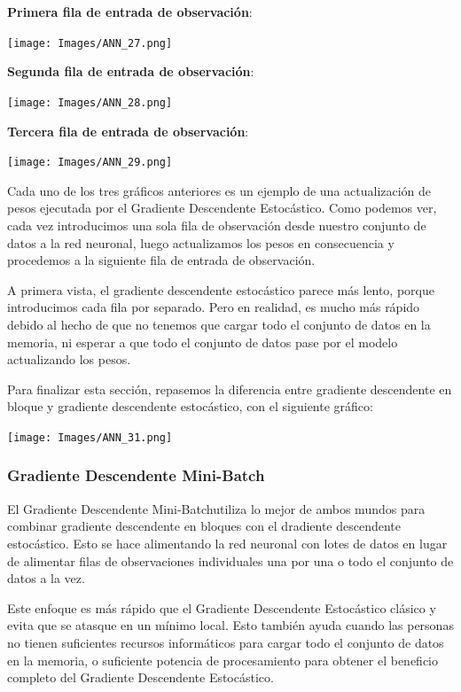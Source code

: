 \documentclass[
]{book}
\begin{document}
\textbf{Primera fila de entrada de observación}:

\texttt{[image: Images/ANN\_27.png]}

\textbf{Segunda fila de entrada de observación}:

\texttt{[image: Images/ANN\_28.png]}

\textbf{Tercera fila de entrada de observación}:

\texttt{[image: Images/ANN\_29.png]}

Cada uno de los tres gráficos anteriores es un ejemplo de una actualización de pesos ejecutada por el Gradiente Descendente Estocástico. Como podemos ver, cada vez introducimos una sola fila de observación desde nuestro conjunto de datos a la red neuronal, luego actualizamos los pesos en consecuencia y procedemos a la siguiente fila de entrada de observación.

A primera vista, el gradiente descendente estocástico parece más lento, porque introducimos cada fila por separado. Pero en realidad, es mucho más rápido debido al hecho de que no tenemos que cargar todo el conjunto de datos en la memoria, ni esperar a que todo el conjunto de datos pase por el modelo actualizando los pesos.

Para finalizar esta sección, repasemos la diferencia entre gradiente descendente en bloque y gradiente descendente estocástico, con el siguiente gráfico:

\texttt{[image: Images/ANN\_31.png]}

\hypertarget{gradiente-descendente-mini-batch}{%
\subsubsection{Gradiente Descendente Mini-Batch}\label{gradiente-descendente-mini-batch}}

El Gradiente Descendente Mini-Batchutiliza lo mejor de ambos mundos para combinar gradiente descendente en bloques con el dradiente descendente estocástico. Esto se hace alimentando la red neuronal con lotes de datos en lugar de alimentar filas de observaciones individuales una por una o todo el conjunto de datos a la vez.

Este enfoque es más rápido que el Gradiente Descendente Estocástico clásico y evita que se atasque en un mínimo local. Esto también ayuda cuando las personas no tienen suficientes recursos informáticos para cargar todo el conjunto de datos en la memoria, o suficiente potencia de procesamiento para obtener el beneficio completo del Gradiente Descendente Estocástico.
\end{document}
